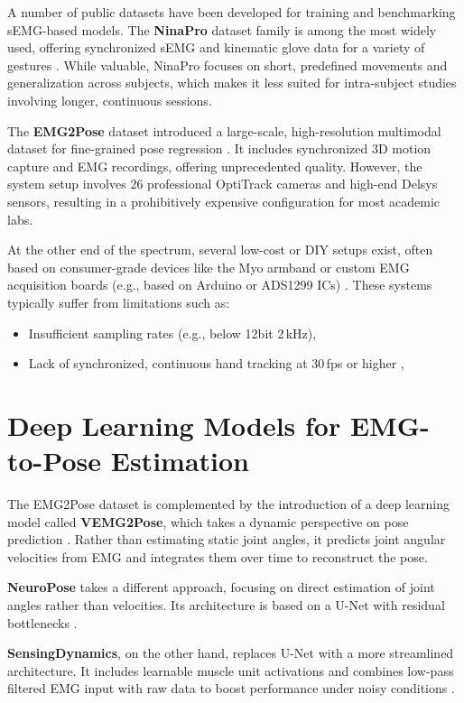 A number of public datasets have been developed for training and benchmarking sEMG-based models. The \textbf{NinaPro} dataset family is among the most widely used, offering synchronized sEMG and kinematic glove data for a variety of gestures \cite{zia2018multiday}. While valuable, NinaPro focuses on short, predefined movements and generalization across subjects, which makes it less suited for intra-subject studies involving longer, continuous sessions.

The \textbf{EMG2Pose} dataset introduced a large-scale, high-resolution multimodal dataset for fine-grained pose regression \cite{salter2024emg2pose}. It includes synchronized 3D motion capture and EMG recordings, offering unprecedented quality. However, the system setup involves 26 professional OptiTrack cameras and high-end Delsys sensors, resulting in a prohibitively expensive configuration for most academic labs.

At the other end of the spectrum, several low-cost or DIY setups exist, often based on consumer-grade devices like the Myo armband or custom EMG acquisition boards (e.g., based on Arduino or ADS1299 ICs) \cite{nasri2020semg}. These systems typically suffer from limitations such as:
\begin{itemize}
    \item Insufficient sampling rates (e.g., below 12bit 2\,kHz),
    \item Lack of synchronized, continuous hand tracking at 30\,fps or higher \cite{graf2023combining},
\end{itemize}

\section{Deep Learning Models for EMG-to-Pose Estimation}

The EMG2Pose dataset is complemented by the introduction of a deep learning model called \textbf{VEMG2Pose}, which takes a dynamic perspective on pose prediction \cite{salter2024emg2pose}. Rather than estimating static joint angles, it predicts joint angular velocities from EMG and integrates them over time to reconstruct the pose.

\textbf{NeuroPose} takes a different approach, focusing on direct estimation of joint angles rather than velocities. Its architecture is based on a U-Net with residual bottlenecks \cite{lee2022explainable}.

\textbf{SensingDynamics}, on the other hand, replaces U-Net with a more streamlined architecture. It includes learnable muscle unit activations and combines low-pass filtered EMG input with raw data to boost performance under noisy conditions \cite{zanghieri2023semg}.

